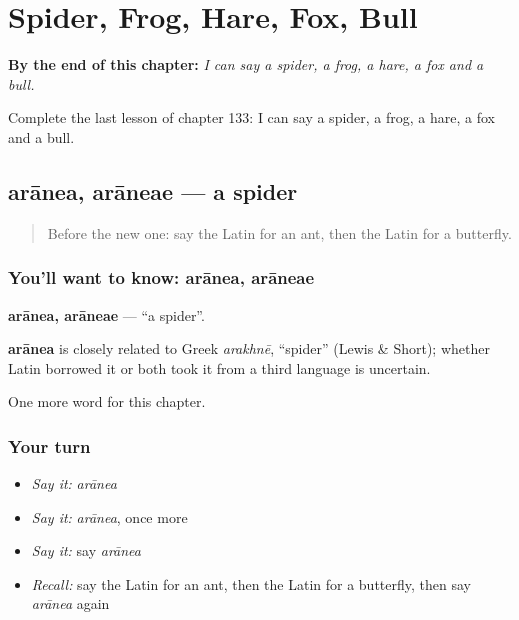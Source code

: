 
\chapter{Spider, Frog, Hare, Fox, Bull}
\label{ch:la-spider-frog-hare-fox-bull}

\begin{chapteropening}
\textbf{By the end of this chapter:} \emph{I can say a spider, a frog, a hare, a fox and a bull.}

Complete the last lesson of chapter 133: I can say a spider, a frog, a hare, a fox and a bull.
\end{chapteropening}

\section[arānea, arāneae]{arānea, arāneae — a spider}

\label{lesson:LA-C133-aranea}



\begin{quote}
Before the new one: say the Latin for an ant, then the Latin for a butterfly.
\end{quote}

\subsection*{You'll want to know: arānea, arāneae}
\textbf{arānea, arāneae} — \textquotedblleft{}a spider\textquotedblright{}.

\begin{cousinweb}
\textbf{arānea} is closely related to Greek \emph{arakhnē}, \textquotedblleft{}spider\textquotedblright{} (Lewis \& Short); whether Latin borrowed it or both took it from a third language is uncertain.
\end{cousinweb}

\begin{grammarlens}[title={What you've built}]
One more word for this chapter.
\end{grammarlens}

\subsection*{Your turn}
\begin{itemize}
\raggedright
  \item \emph{Say it:} \emph{arānea}
  \item \emph{Say it:} \emph{arānea}, once more
  \item \emph{Say it:} say \emph{arānea}
  \item \emph{Recall:} say the Latin for an ant, then the Latin for a butterfly, then say \emph{arānea} again
\end{itemize}

